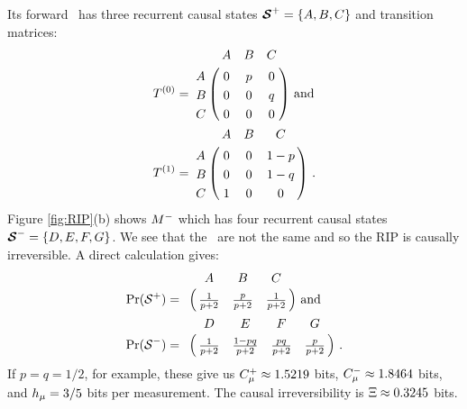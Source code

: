 Its forward \eM\ has three recurrent causal states
${\boldsymbol{\mathcal{S}}}^{+} = \{ A, B, C \}$ and transition matrices:
\begin{align*}
T^{(0)} &=
  \bordermatrix{%
      & A & B   & C \cr
    A & 0 & p & 0 \cr
    B & 0 & 0   & q \cr
    C & 0 & 0   & 0
  }
  \mathrm{~and}\\
T^{(1)} &=
  \bordermatrix{%
      & A & B   & C \cr
    A & 0 & 0   & 1-p \cr
    B & 0 & 0   & 1-q \cr
    C & 1 & 0   & 0
  } ~.
\end{align*}
Figure \ref{fig:RIP}(b) shows ${M}^{-}$ which has four recurrent causal states
${\boldsymbol{\mathcal{S}}}^{-} = \{ D, E, F, G \}$. We see that the \eMs\ are not the
same and so the RIP is causally irreversible. A direct calculation gives:
\begin{align*}
\Pr(\FutureCausalState) &=
  \bordermatrix{
      & A & B  & C \cr
      & \tfrac{1}{p+2} & \tfrac{p}{p+2} & \tfrac{1}{p+2}
  }
  \mathrm{~and}\\
\Pr(\PastCausalState) &=
  \bordermatrix{
      & D   & E    & F    & G \cr
      & \tfrac{1}{p+2} & \tfrac{1-pq}{p+2} & \tfrac{pq}{p+2} & \tfrac{p}{p+2}
  } ~.
\end{align*}
If $p = q = 1/2$, for example, these give us $C_\mu^{+} \approx 1.5219$ bits,
$C_\mu^{-} \approx 1.8464$ bits, and $h_\mu = 3/5$ bits per measurement.
The causal irreversibility is $\Xi \approx 0.3245$ bits.

